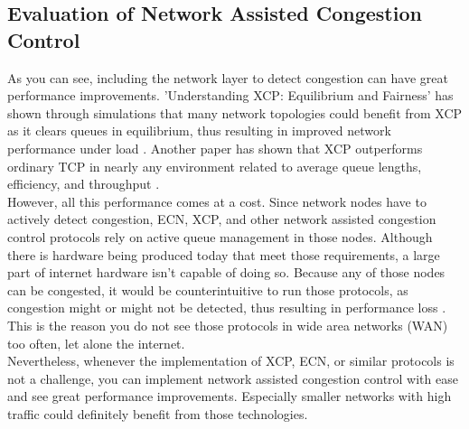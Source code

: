 \documentclass[a4paper,conference]{IEEEtran}
\begin{document}
\subsection{Evaluation of Network Assisted Congestion Control}
As you can see, including the network layer to detect congestion can have great performance improvements. 'Understanding XCP: Equilibrium and Fairness' has shown through simulations that many network topologies could benefit from XCP as it clears queues in equilibrium, thus resulting in improved network performance under load \cite{1498331}. Another paper has shown that XCP outperforms ordinary TCP in nearly any environment related to average queue lengths, efficiency, and throughput \cite{katabi2002congestion}.
\\However, all this performance comes at a cost. Since network nodes have to actively detect congestion, ECN, XCP, and other network assisted congestion control protocols rely on active queue management in those nodes. Although there is hardware being produced today that meet those requirements, a large part of internet hardware isn't capable of doing so. Because any of those nodes can be congested, it would be counterintuitive to run those protocols, as congestion might or might not be detected, thus resulting in performance loss \cite{katabi2002congestion}. This is the reason you do not see those protocols in wide area networks (WAN) too often, let alone the internet.
\\Nevertheless, whenever the implementation of XCP, ECN, or similar protocols is not a challenge, you can implement network assisted congestion control with ease and see great performance improvements. Especially smaller networks with high traffic could definitely benefit from those technologies.
\end{document}
